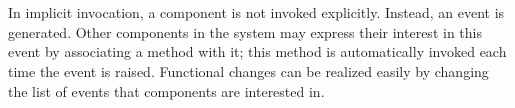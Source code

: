 \documentclass{article}
\begin{document}
\noindent \\\\In implicit invocation, a component is not invoked explicitly. Instead, an event is generated. Other components in the system may express their interest in this event by associating a method with it; this method is automatically invoked each time the event is raised. Functional changes can be realized easily by changing the list of events that components are interested in.
\end{document}
